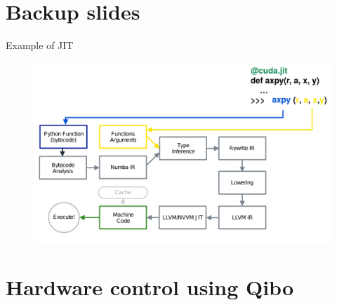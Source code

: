 \documentclass[11p,aspectratio=169]{beamer}
\begin{document}
\section{Backup slides}

\begin{frame}{Example of JIT}
    \begin{figure}
        \includegraphics[width= \textwidth]{figures/how_numba.png}
    \end{figure}
    
\end{frame}

\section{Hardware control using Qibo}



    
\end{document}
